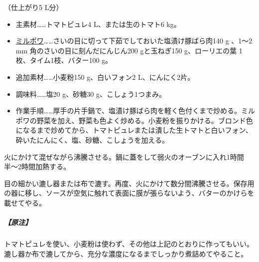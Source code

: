 \begin{recette}
（仕上がり5 L分）

\begin{itemize}
\item
  主素材\ldots{}\ldots{}トマトピュレ4 L、または生のトマト6 kg。
\item
  \protect\hyperlink{mirepoix}{ミルポワ}\ldots{}\ldots{}さいの目に切って下茹でしておいた塩漬け豚ばら肉140
  g 、1〜2 mm 角のさいの目に刻んだにんじん200 gと玉ねぎ150
  g、ローリエの葉 1枚、タイム1枝、バター100 g。
\item
  追加素材\ldots{}\ldots{}小麦粉150 g、白いフォン2 L、にんにく2片。
\item
  調味料\ldots{}\ldots{}塩20 g、砂糖30 g、こしょう1つまみ。
\item
  作業手順\ldots{}\ldots{}厚手の片手鍋で、塩漬け豚ばら肉を軽く色付くまで炒める。ミルポワの野菜を加え、野菜も色よく炒める。小麦粉を振りかける。ブロンド色になるまで炒めてから、トマトピュレまたは潰した生トマトと白いフォン、砕いたにんにく、塩、砂糖、こしょうを加える。
\end{itemize}

火にかけて混ぜながら沸騰させる。鍋に蓋をして弱火のオーブンに入れ1時間半〜2時間加熱する。

目の細かい漉し器または布で漉す。再度、火にかけて数分間沸騰させる。保存用の器に移し、ソースが空気に触れて表面に膜が張らないよう、バターのかけらを載せてやる。

\hypertarget{nota-sauce-tomate}{%
\subparagraph{【原注】}\label{nota-sauce-tomate}}

トマトピュレを使い、小麦粉は使わず、その他は上記のとおりに作ってもいい。漉し器か布で漉してから、充分な濃度になるまでしっかり煮詰めてやること。
\end{recette}